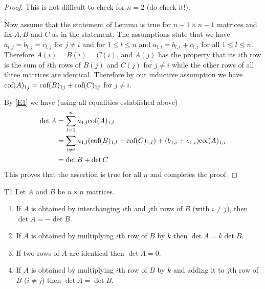 \begin{proof} 
This is not difficult to check for $n=2$ (do check it!). 

Now assume that the statement of Lemma is true for $n-1\times n-1$ matrices and 
fix $A,B$ and $C$ as in the statement. 
The assumptions state that 
we have  $a_{l,j}=b_{l,j}=c_{l,j}$ for $j\neq i$ and for $1\leq l\leq n$
and $a_{l,i}=b_{l,i}+c_{l,i}$ for all $1\leq l\leq n$. 
Therefore $A(i)=B(i)=C(i)$, and $A(j)$ has the property that 
its $i$th row is the sum of $i$th rows of $B(j)$ and $C(j)$ for $j\neq i$ while the  other rows of all three matrices are identical.  
Therefore by our inductive assumption we have $\mbox{\rm cof}(A)_{1j}=\mbox{\rm cof}(B)_{1j}+\mbox{\rm cof}(C)_{1j}$
for $j\neq i$. 

By \eqref{E1} we have (using all equalities established above) 
\begin{align*}
\det A&=\sum_{l=1}^n a_{1,l} \mbox{\rm cof}(A)_{1,l}\\
 &=\sum_{l\neq i} a_{1,l}(\mbox{\rm cof}(B)_{1,l}+\mbox{\rm cof}(C)_{1,l})+ 
(b_{1,i}+c_{1,i})\mbox{\rm cof}(A)_{1,i}\\
&=
\det B+\det C
\end{align*}
This proves that the assertion is true for all $n$ and completes the proof.  
\end{proof} 

\begin{theorem}{} {T1} 
Let $A$ and $B$ be $n\times n$ matrices. 
\begin{enumerate}
\item If $A$ is obtained by interchanging $i$th and $j$th rows  of $B$ (with $i\neq j$), then $\det A=-\det B$. 
\item If $A$ is obtained by multiplying $i$th row of $B$ by $k$ then $\det A=k\det B$. 
\item If two rows of $A$ are identical then $\det A=0$. 
\item If $A$ is obtained by multiplying $i$th row of $B$ by $k$ and adding it to 
$j$th row of $B$ ($i\neq j$) then $\det A=\det B$. 
\end{enumerate}
\end{theorem}


